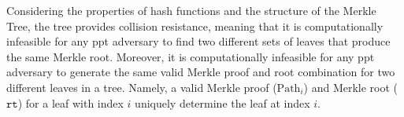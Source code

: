 Considering the properties of hash functions and the structure of the Merkle Tree, the tree provides collision resistance, meaning that it is computationally infeasible for any \gls{ppt} adversary to find two different sets of leaves that produce the same Merkle root.  Moreover, it is computationally infeasible for any \gls{ppt} adversary to generate the same valid Merkle proof and root combination for two different leaves in a tree. Namely, a valid Merkle proof ($\text{Path}_i$) and Merkle root ($\texttt{rt}$) for a leaf with index $i$ uniquely determine the leaf at index $i$. 










